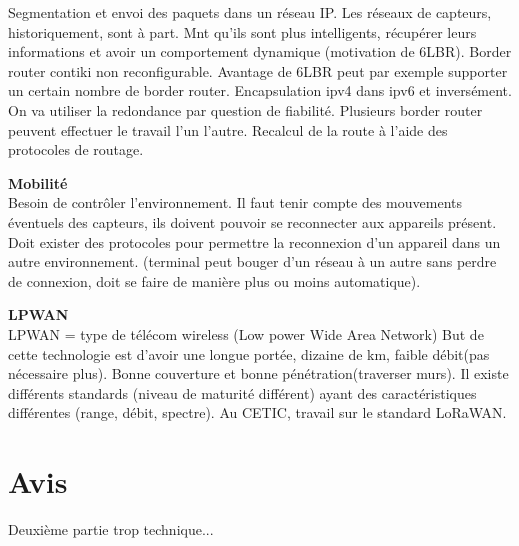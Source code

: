 \documentclass[10pt,a4paper]{article}
\begin{document}
Segmentation et envoi des paquets dans un réseau IP. 
Les réseaux de capteurs, historiquement, sont à part. 
Mnt qu'ils sont plus intelligents, récupérer leurs informations et avoir un comportement dynamique (motivation de 6LBR).
Border router contiki non reconfigurable.
Avantage de 6LBR peut par exemple supporter un certain nombre de border router. Encapsulation ipv4 dans ipv6 et inversément. 
On va utiliser la redondance par question de fiabilité. Plusieurs border router peuvent effectuer le travail l'un l'autre. Recalcul de la route à l'aide des protocoles de routage. 

\textbf{Mobilité} \\
Besoin de contrôler l'environnement. Il faut tenir compte des mouvements éventuels des capteurs, ils doivent pouvoir se reconnecter aux appareils présent. Doit exister des protocoles pour permettre la reconnexion d'un appareil dans un autre environnement. (terminal peut bouger d'un réseau à un autre sans perdre de connexion, doit se faire de manière plus ou moins automatique). 

\textbf{LPWAN} \\
LPWAN = type de télécom wireless  (Low power Wide Area Network)
But de cette technologie est d'avoir une longue portée, dizaine de km, faible débit(pas nécessaire plus).
Bonne couverture et bonne pénétration(traverser murs).
Il existe différents standards (niveau de maturité différent) ayant des caractéristiques différentes (range, débit, spectre).
Au CETIC, travail sur le standard LoRaWAN. 
\section{Avis}
Deuxième partie trop technique...
\end{document}
